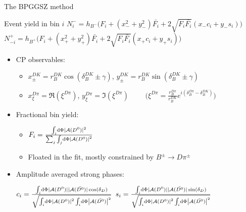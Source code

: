 \documentclass{beamer}
\begin{document}
\begin{frame}{The BPGGSZ method}
  \begin{block}{Event yield in bin $i$}
    \scriptsize
    $N^-_i = h_{B^-}\big(F_i + (x_-^2 + y_-^2)\bar{F_i} + 2\sqrt{F_i\bar{F_i}}(x_-c_i + y_-s_i)\big)$ \\
    $N^+_{-i} = h_{B^+}\big(F_i + (x_+^2 + y_+^2)\bar{F_i} + 2\sqrt{F_i\bar{F_i}}(x_+c_i + y_+s_i)\big)$
  \end{block}
  \begin{itemize}
    \item{CP observables:}
    \begin{itemize}
      \item{$x_\pm^{DK} = r_B^{DK}\cos(\delta_B^{DK}\pm\gamma)$, \quad $y_\pm^{DK} = r_B^{DK}\sin(\delta_B^{DK}\pm\gamma)$}
      \item{$x_\xi^{D\pi} = \Re(\xi^{D\pi})$, $y_\xi^{D\pi} = \Im(\xi^{D\pi})$ $\quad\quad\Big(\xi^{D\pi} = \frac{r_B^{D\pi}}{r_B^{DK}}e^{i(\delta_B^{D\pi} - \delta_B^{DK})}\Big)$}
    \end{itemize}
    \item{Fractional bin yield:}
    \begin{itemize}
      \item{$F_i = \frac{\int_i\dd{\Phi}|\mathcal{A}(D^0)|^2}{\sum_j\int_j\dd{\Phi}\abs{\mathcal{A}(D^0)}^2}$}
      \item{Floated in the fit, mostly constrained by $B^\pm\to D\pi^\pm$}
    \end{itemize}
  \end{itemize}
  \begin{itemize}
    \item{Amplitude averaged strong phases:}
    \begin{center}
      $c_i = \frac{\int_i\dd{\Phi}|\mathcal{A}(D^0)||\mathcal{A}(\bar{D^0})|\cos(\delta_D)}{\sqrt{\int_i\dd{\Phi}\abs{\mathcal{A}(D^0)}^2\int_i\dd{\Phi}\abs{\mathcal{A}(\bar{D^0})}^2}}$ \quad $s_i = \frac{\int_i\dd{\Phi}|\mathcal{A}(D^0)||\mathcal{A}(\bar{D^0})|\sin(\delta_D)}{\sqrt{\int_i\dd{\Phi}\abs{\mathcal{A}(D^0)}^2\int_i\dd{\Phi}\abs{\mathcal{A}(\bar{D^0})}^2}}$
    \end{center}
  \end{itemize}
\end{frame}
\end{document}
